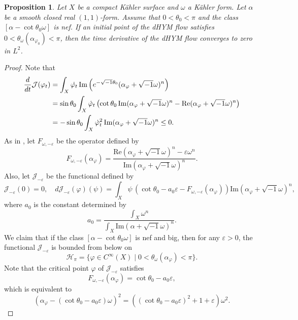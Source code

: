 \documentclass[10pt,a4paper]{amsart}
\newtheorem{prop}{Proposition}
\begin{document}
\begin{prop}
    Let $X$ be a compact K{\"a}hler surface and $\omega$ a K{\"a}hler form. Let $\alpha$ be a smooth closed real $(1,1)$-form. Assume that $0 <\theta_0 < \pi$ and the class $[\alpha-\cot{\theta_0}\omega]$ is nef. If an initial point of the dHYM flow satisfies $0 < \theta_\omega(\alpha_{\varphi_0}) < \pi$, then the time derivative of the dHYM flow converges to zero in $L^2$.
\end{prop}

\begin{proof}
    Note that
    \begin{align}\label{eqdhymderiv}
        \frac{d}{dt}\mathcal{J}(\varphi_t)
        &=\int_X \dot{\varphi_t} \, \mathrm{Im}\left(e^{-\sqrt{-1}\theta_0}(\alpha_\varphi+\sqrt{-1}\omega)^n\right) \notag\\
        &=\sin{\theta_0}\int_X \dot{\varphi}_t \left(\cot{\theta_0}\, \mathrm{Im}(\alpha_\varphi+\sqrt{-1}\omega)^n-\mathrm{Re}(\alpha_\varphi+\sqrt{-1}\omega)^n
        \right) \notag\\
        &=-\sin{\theta_0}\int_X \dot{\varphi}_t^2 \, \mathrm{Im}(\alpha_\varphi+\sqrt{-1}\omega)^n \le0.
    \end{align}
    As in \cite{CL}, let $F_{\omega,-\varepsilon}$ be the operator defined by
    $$F_{\omega,-\varepsilon}(\alpha_\varphi)= \frac{\mathrm{Re}(\alpha_\varphi+\sqrt{-1}\omega)^n-\varepsilon\omega^n}{\mathrm{Im}(\alpha_\varphi+\sqrt{-1}\omega)^n}.$$
    Also, let $\mathcal{J}_{-\varepsilon}$ be the functional defined by
    $$\mathcal{J}_{-\varepsilon}(0)=0, \quad d\mathcal{J}_{-\varepsilon}(\varphi)(\psi)=\int_X \psi \, \left(\cot{\theta_0}-a_0\varepsilon-F_{\omega,-\varepsilon}(\alpha_\varphi)\right)\mathrm{Im}(\alpha_\varphi+\sqrt{-1}\omega)^n,$$
    where $a_0$ is the constant determined by
    $$a_0=\frac{\int_X\omega^n}{\int_X \mathrm{Im}(\alpha+\sqrt{-1}\omega)^n}.$$
    We claim that if the class $[\alpha-\cot{\theta_0}\omega]$ is nef and big, then for any $\varepsilon>0$, the functional $\mathcal{J}_{-\varepsilon}$ is bounded from below on 
    $$\mathcal{H}_\pi=\{ \varphi \in C^\infty(X) \mid  0 < \theta_\omega(\alpha_\varphi) < \pi\}.$$
    Note that the critical point $\varphi$ of $\mathcal{J}_{-\varepsilon}$ satisfies
    $$F_{\omega,-\varepsilon}(\alpha_\varphi)=\cot{\theta_0}-a_0\varepsilon,$$
    which is equivalent to
    \begin{equation}\label{eqMA}
        \left(\alpha_\varphi-(\cot{\theta_0}-a_0\varepsilon)\omega\right)^2=(\left(\cot{\theta_0}-a_0\varepsilon\right)^2+1+\varepsilon)\omega^2.

\end{equation}
\end{proof}
\end{document}
